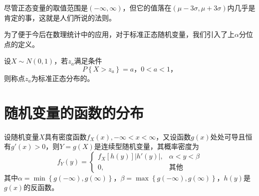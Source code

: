 尽管正态变量的取值范围是$ \left( -\infty, \infty \right)  $，但它的值落在$ \left( \mu - 3\sigma, \mu + 3\sigma \right)  $内几乎是肯定的事，这就是人们所说的\mydoublequote{$ 3\sigma $}法则。

为了便于今后在数理统计中的应用，对于标准正态随机变量，我们引入了上$ \alpha $分位点的定义。

\begin{definition}
	设$ X \sim N(0,1) $，若$ z_{a} $满足条件
	\begin{equation}
		P\left\lbrace X > z_{a} \right\rbrace = a\text{，}0 < a < 1\text{，}
	\end{equation}
	则称点$ z_{a} $为标准正态分布的。
\end{definition}

\section{随机变量的函数的分布}

\begin{theorem}
	设随机变量$ X $具有密度函数$ f_X(x),-\infty < x < \infty $，又设函数$ g(x) $处处可导且恒有$ g'(x) > 0 $，则$ Y = g(X) $是连续型随机变量，其概率密度为
	\begin{equation}
		f_Y(y) = \left\lbrace
			\begin{array}{ll}
				f_X[h(y)]\left| h'(y)\right| , & \alpha < y < \beta\\
				0, & \text{其他}
			\end{array}
		\right. 
	\end{equation}
	其中$ \alpha = \min\left\lbrace g(-\infty), g(\infty) \right\rbrace $，$ \beta = \max\left\lbrace g(-\infty), g(\infty) \right\rbrace $，$ h(y) $是$ g(x) $的反函数。
\end{theorem}
